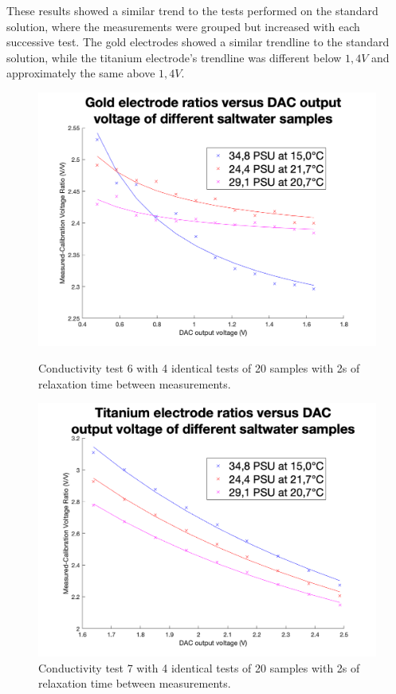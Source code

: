 These results showed a similar trend to the tests performed on the standard solution, where the measurements were grouped but increased with each successive test.
The gold electrodes showed a similar trendline to the standard solution, while the titanium electrode's trendline was different below $1,4V$ and approximately the same above $1,4V$.

\begin{figure}[ht]
    \begin{minipage}{0.5\textwidth}
        \centering
        \includegraphics[width=\textwidth]{Figures/Testing/Au_sweep_analysis}
        \caption{Conductivity test 6 with 4 identical tests of 20 samples with 2s of relaxation time between measurements.}
        \label{fig:test15} %
    \end{minipage}
    \begin{minipage}{0.5\textwidth}
        \centering
        \includegraphics[width=\textwidth]{Figures/Testing/Ti_sweep_analysis}
        \caption{Conductivity test 7 with 4 identical tests of 20 samples with 2s of relaxation time between measurements.}
        \label{fig:test16} %
    \end{minipage}
\end{figure}

